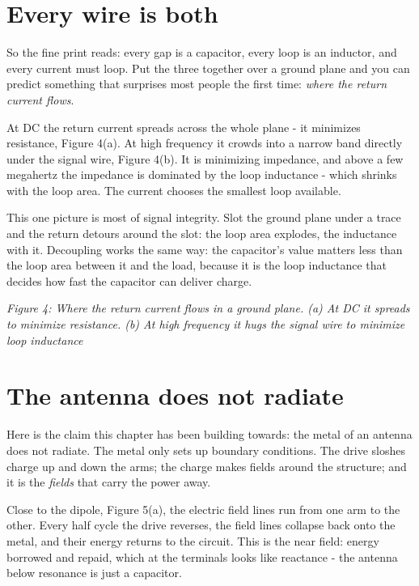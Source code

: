 \section{Every wire is both}\label{every-wire-is-both}

So the fine print reads: every gap is a capacitor, every loop is an
inductor, and every current must loop. Put the three together over a
ground plane and you can predict something that surprises most people
the first time: \emph{where the return current flows}.

At DC the return current spreads across the whole plane - it minimizes
resistance, Figure 4(a). At high frequency it crowds into a narrow band
directly under the signal wire, Figure 4(b). It is minimizing impedance,
and above a few megahertz the impedance is dominated by the loop
inductance - which shrinks with the loop area. The current chooses the
smallest loop available.

This one picture is most of signal integrity. Slot the ground plane
under a trace and the return detours around the slot: the loop area
explodes, the inductance with it. Decoupling works the same way: the
capacitor's value matters less than the loop area between it and the
load, because it is the loop inductance that decides how fast the
capacitor can deliver charge.


{
\centering
{}
}

\emph{Figure 4: Where the return current flows in a ground plane. (a) At
DC it spreads to minimize resistance. (b) At high frequency it hugs the
signal wire to minimize loop inductance}

\section{The antenna does not
radiate}\label{the-antenna-does-not-radiate}

Here is the claim this chapter has been building towards: the metal of
an antenna does not radiate. The metal only sets up boundary conditions.
The drive sloshes charge up and down the arms; the charge makes fields
around the structure; and it is the \emph{fields} that carry the power
away.

Close to the dipole, Figure 5(a), the electric field lines run from one
arm to the other. Every half cycle the drive reverses, the field lines
collapse back onto the metal, and their energy returns to the circuit.
This is the near field: energy borrowed and repaid, which at the
terminals looks like reactance - the antenna below resonance is just a
capacitor.

